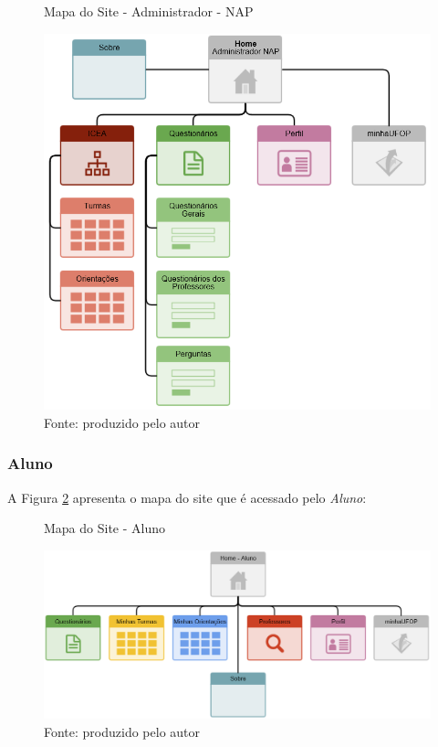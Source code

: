 \documentclass[
  12pt,       %
  openright,      %
  oneside,      %
  a4paper,      %
  english,      %
  french,        %
  spanish,     %
  brazil        %
  ]{abntex2-decsi}
\begin{document}
        \begin{figure}[h]	
            \centering
            \caption{Mapa do Site - Administrador - NAP}						   \label{fig:websitemap_adminnap}
            \includegraphics[width=1\textwidth]{img/websitemap_adminnap}
            \caption*{Fonte: produzido pelo autor}
    	\end{figure}
        
        \newpage
        
        \subsubsection{Aluno}
		
        A Figura \ref{fig:websitemap_student} apresenta o mapa do site que é acessado pelo \textit{Aluno}:
        
        \begin{figure}[h]	
            \centering
            \caption{Mapa do Site - Aluno}						   \label{fig:websitemap_student}
            \includegraphics[width=1\textwidth]{img/websitemap_student}
            \caption*{Fonte: produzido pelo autor}
    	\end{figure}
        
\end{document}
